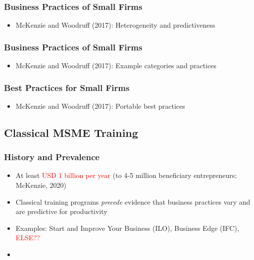 \documentclass[10pt]{beamer}
\begin{document}

\begin{frame}
\frametitle{Business Practices of Small Firms}
	\begin{itemize}
	\item McKenzie and Woodruff (2017): Heterogeneity and predictiveness
	\vspace{0.2in}
	\end{itemize}
\end{frame}

\begin{frame}
\frametitle{Business Practices of Small Firms}
	\begin{itemize}
	\item McKenzie and Woodruff (2017): Example categories and practices
	\vspace{0.2in}
	\end{itemize}
\end{frame}


\begin{frame}
\frametitle{Best Practices for Small Firms}
	\begin{itemize}
	\item McKenzie and Woodruff (2017): Portable best practices
	\vspace{0.2in}
	\end{itemize}
\end{frame}


\subsection{Classical MSME Training}

\begin{frame}
\frametitle{History and Prevalence}
	\begin{itemize}
	\item At least \textcolor{red}{USD 1 billion per year} (to 4-5 million beneficiary entrepreneurs; McKenzie, 2020)
	\vspace{0.1in}
	\item Classical training programs \emph{precede} evidence that business practices vary and are predictive for productivity
	\vspace{0.2in}
	\item Examples: Start and Improve Your Business (ILO), Business Edge (IFC), \textcolor{red}{ELSE??}
	\item 
	\vspace{0.1in}
	\end{itemize}
\end{frame}
\end{document}
